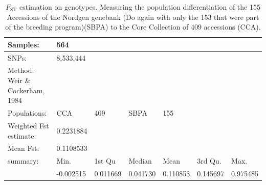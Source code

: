 \documentclass[9pt, twocolumn,twoside]{gsajnl}
\begin{document}
\begin{table}
\begin{table}[p]
\centering 
\caption{$F_{\text{ST}}$ estimation on genotypes. Measuring the population differentiation of  the 155 Accessions of the Nordgen genebank (Do again with only the 153 that were part of the breeding program)(SBPA) to the Core Collection of 409 accessions (CCA).}

\begin{tableminipage}{\textwidth}
\begin{tabular}{|l|l|l|l|l|l|l|}
\hline

Samples:                        &564        &          &          &          &          &          \\ \hline
SNPs:                           & 8,533,444 &          &          &          &          &          \\ \hline
Method: Weir \& Cockerham, 1984 &           &          &          &          &          &          \\ \hline
Populations:                  & CCA       & 409      & SBPA     & 155      &          &          \\ \hline
Weighted Fst estimate:          &0.2231884  &          &          &          &          &          \\ \hline
Mean Fst:                       &0.1108533  &          &          &          &          &          \\ \hline
summary:                        & Min.      & 1st Qu   & Median   & Mean     & 3rd Qu.  & Max.     \\ \hline
                                & -0.002515 & 0.011669 & 0.041730 & 0.110853 & 0.145697 & 0.975485 \\ \hline
\end{tabular}
  \label{tab:fst}
\end{tableminipage}
\end{table}
\end{table}
\end{document}
